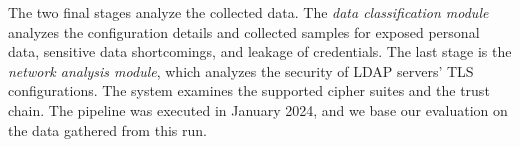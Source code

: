 The two final stages analyze the collected data. The \emph{data classification module} analyzes the configuration details and collected samples for exposed personal data, sensitive data shortcomings, and leakage of credentials. 
The last stage is the \emph{network analysis module}, which analyzes the security of LDAP servers' TLS configurations. 
The system examines the supported cipher suites and the trust chain.
The  pipeline was executed in January 2024, and we base our evaluation on the data gathered from this run.





